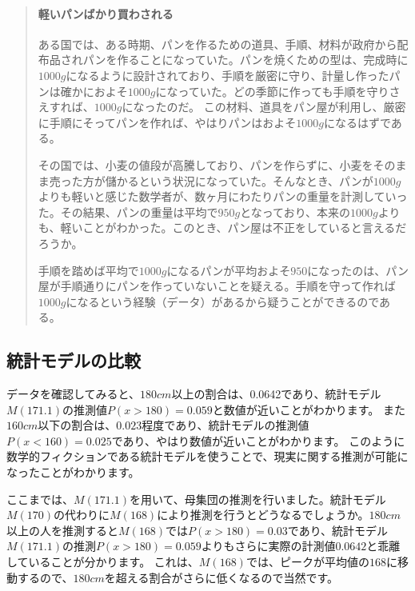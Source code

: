 \documentclass[a4paper,11pt,dvipdfmx]{jsarticle}
\begin{document}
\begin{mybox}
\begin{quote}
\paragraph{軽いパンばかり買わされる}
ある国では、ある時期、パンを作るための道具、手順、材料が政府から配布品されパンを作ることになっていた。パンを焼くための型は、完成時に$1000g$になるように設計されており、手順を厳密に守り、計量し作ったパンは確かにおよそ$1000g$になっていた。どの季節に作っても手順を守りさえすれば、$1000g$になったのだ。
この材料、道具をパン屋が利用し、厳密に手順にそってパンを作れば、やはりパンはおよそ$1000g$になるはずである。

その国では、小麦の値段が高騰しており、パンを作らずに、小麦をそのまま売った方が儲かるという状況になっていた。そんなとき、パンが$1000g$よりも軽いと感じた数学者が、数ヶ月にわたりパンの重量を計測していった。その結果、パンの重量は平均で$950g$となっており、本来の$1000g$よりも、軽いことがわかった。このとき、パン屋は不正をしていると言えるだろうか。

手順を踏めば平均で$1000g$になるパンが平均およそ$950$になったのは、パン屋が手順通りにパンを作っていないことを疑える。手順を守って作れば$1000g$になるという経験（データ）があるから疑うことができるのである。
\end{quote}
\end{mybox}

\subsection{ 統計モデルの比較}
データを確認してみると、$180cm$以上の割合は、0.0642であり、統計モデル$M(171.1)$の推測値$P(x>180)=0.059$と数値が近いことがわかります。
また$160cm$以下の割合は、$0.023$程度であり、統計モデルの推測値$P(x<160)=0.025$であり、やはり数値が近いことがわかります。
このように数学的フィクションである統計モデルを使うことで、現実に関する推測が可能になったことがわかります。


ここまでは、$M(171.1)$を用いて、母集団の推測を行いました。統計モデル$M(170)$の代わりに$M(168)$により推測を行うとどうなるでしょうか。$180cm$以上の人を推測すると$M(168)$では$P(x>180)=0.03$であり、統計モデル$M(171.1)$の推測$P(x>180)=0.059$よりもさらに実際の計測値$0.0642$と乖離していることが分かります。
これは、$M(168)$では、ピークが平均値の$168$に移動するので、$180cm$を超える割合がさらに低くなるので当然です。
\end{document}
